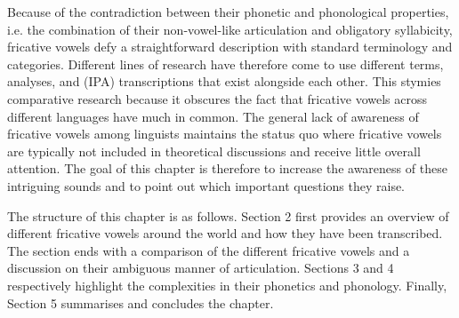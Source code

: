 \documentclass[output=paper,colorlinks,citecolor=brown,chinesefont]{langscibook}
\begin{document}
Because of the contradiction between their phonetic and phonological properties, i.e. the combination of their non-vowel-like articulation and obligatory syllabicity, fricative vowels defy a straightforward description with standard terminology and categories. Different lines of research have therefore come to use different terms, analyses, and (IPA) transcriptions that exist alongside each other. This stymies comparative research because it obscures the fact that fricative vowels across different languages have much in common. The general lack of awareness of fricative vowels among linguists maintains the status quo where fricative vowels are typically not included in theoretical discussions and receive little overall attention. The goal of this chapter is therefore to increase the awareness of these intriguing sounds and to point out which important questions they raise.

The structure of this chapter is as follows. Section 2 first provides an overview of different fricative vowels around the world and how they have been transcribed. The section ends with a comparison of the different fricative vowels and a discussion on their ambiguous manner of articulation. Sections 3 and 4 respectively highlight the complexities in their phonetics and phonology. Finally, Section 5 summarises and concludes the chapter.

\end{document}
